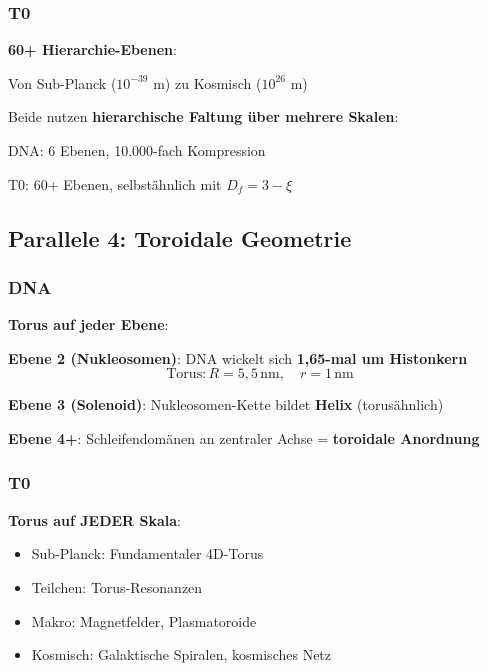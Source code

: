 	\subsubsection{T0}
	
	\textbf{60+ Hierarchie-Ebenen}:
	
	Von Sub-Planck ($10^{-39}$ m) zu Kosmisch ($10^{26}$ m)
	
	\begin{keyresult}
		Beide nutzen \textbf{hierarchische Faltung über mehrere Skalen}:
		
		DNA: 6 Ebenen, 10.000-fach Kompression
		
		T0: 60+ Ebenen, selbstähnlich mit $D_f = 3-\xi$
	\end{keyresult}
	
	\subsection{Parallele 4: Toroidale Geometrie}
	
	\subsubsection{DNA}
	
	\textbf{Torus auf jeder Ebene}:
	
	\textbf{Ebene 2 (Nukleosomen)}: DNA wickelt sich \textbf{1,65-mal um Histonkern}
	\begin{equation}
		\text{Torus}: R = 5{,}5\,\text{nm}, \quad r = 1\,\text{nm}
	\end{equation}
	
	\textbf{Ebene 3 (Solenoid)}: Nukleosomen-Kette bildet \textbf{Helix} (torusähnlich)
	
	\textbf{Ebene 4+}: Schleifendomänen an zentraler Achse = \textbf{toroidale Anordnung}
	
	\subsubsection{T0}
	
	\textbf{Torus auf JEDER Skala}:
	\begin{itemize}
		\item Sub-Planck: Fundamentaler 4D-Torus
		\item Teilchen: Torus-Resonanzen
		\item Makro: Magnetfelder, Plasmatoroide
		\item Kosmisch: Galaktische Spiralen, kosmisches Netz
	\end{itemize}
	
